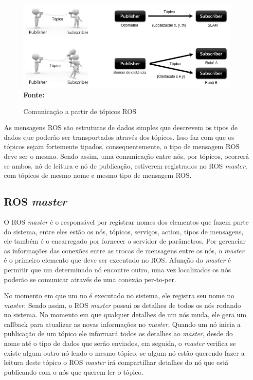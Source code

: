 \begin{figure}[ht]
	\caption{Comunicação a partir de tópicos ROS}
	\begin{center}
		\includegraphics[scale=0.51]{imagens/rostopic.png}\\
		{\small \textbf{Fonte:} }
    \end{center}\label{fig:rostopic}
\end{figure}

As mensagens ROS são estruturas de dados simples que descrevem os tipos de dados que poderão ser transportados através dos tópicos. Isso faz com que os tópicos sejam fortemente tipados, consequentemente, o tipo de mensagem ROS deve ser o mesmo. Sendo assim, uma comunicação entre nós, por tópicos, ocorrerá se ambos, nó de leitura e nó de publicação, estiverem registrados no ROS \textit{master}, com tópicos de mesmo nome e mesmo tipo de mensagem ROS\@.


\subsection{ROS \textit{master}}

O ROS \textit{master} é o responsável por registrar nomes dos elementos que fazem parte do sistema, entre eles estão os nós, tópicos, serviços, action, tipos de mensagens, ele também é o encarregado por fornecer o servidor de parâmetros. Por gerenciar as informações das conexões entre as trocas de mensagens entre os nós, o \textit{master} é o primeiro elemento que deve ser executado no ROS. Afunção do \textit{master} é permitir que um determinado nó encontre outro, uma vez localizados os nós poderão se comunicar através de uma conexão per-to-per.

No momento em que um no é executado no sistema, ele registra seu nome no \textit{master}. Sendo assim, o ROS \textit{master} possui os detalhes de todos os nós rodando no sistema. No momento em que qualquer detalhes de um nós muda, ele gera um callback para atualizar as novas informações no \textit{master}. Quando um nó inicia a publicação de um tópico ele informará todos os detalhes ao \textit{master}, desde do nome até o tipo de dados que serão enviados, em seguida, o \textit{master} verifica se existe algum outro nó lendo o mesmo tópico, se algum nó estão querendo fazer a leitura deste tópico o ROS \textit{master} irá compartilhar detalhes do nó que está publicando com o nós que querem ler o tópico.

